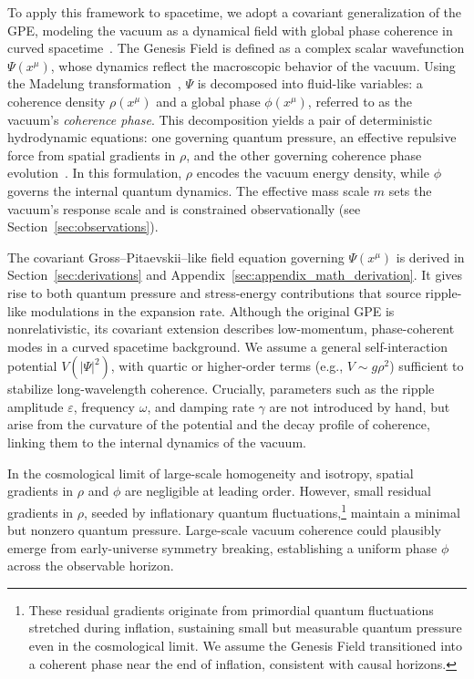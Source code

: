 To apply this framework to spacetime, we adopt a covariant generalization of the GPE, modeling the vacuum as a dynamical field with global phase coherence in curved spacetime~\cite{Barcelo2005,volovik2003universe}. The Genesis Field is defined as a complex scalar wavefunction \( \Psi(x^\mu) \), whose dynamics reflect the macroscopic behavior of the vacuum. Using the Madelung transformation~\cite{Madelung1927}, \( \Psi \) is decomposed into fluid-like variables: a coherence density \( \rho(x^\mu) \) and a global phase \( \phi(x^\mu) \), referred to as the vacuum’s \emph{coherence phase}. This decomposition yields a pair of deterministic hydrodynamic equations: one governing quantum pressure, an effective repulsive force from spatial gradients in \( \rho \), and the other governing coherence phase evolution~\cite{volovik2003universe,Barcelo2005}. In this formulation, \( \rho \) encodes the vacuum energy density, while \( \phi \) governs the internal quantum dynamics. The effective mass scale \( m \) sets the vacuum’s response scale and is constrained observationally (see Section~\ref{sec:observations}).

The covariant Gross–Pitaevskii–like field equation governing \( \Psi(x^\mu) \) is derived in Section~\ref{sec:derivations} and Appendix~\ref{sec:appendix_math_derivation}. It gives rise to both quantum pressure and stress-energy contributions that source ripple-like modulations in the expansion rate. Although the original GPE is nonrelativistic, its covariant extension describes low-momentum, phase-coherent modes in a curved spacetime background. We assume a general self-interaction potential \( V(|\Psi|^2) \), with quartic or higher-order terms (e.g., \( V \sim g \rho^2 \)) sufficient to stabilize long-wavelength coherence. Crucially, parameters such as the ripple amplitude \( \varepsilon \), frequency \( \omega \), and damping rate \( \gamma \) are not introduced by hand, but arise from the curvature of the potential and the decay profile of coherence, linking them to the internal dynamics of the vacuum.

In the cosmological limit of large-scale homogeneity and isotropy, spatial gradients in \( \rho \) and \( \phi \) are negligible at leading order. However, small residual gradients in \( \rho \), seeded by inflationary quantum fluctuations,\footnote{These residual gradients originate from primordial quantum fluctuations stretched during inflation, sustaining small but measurable quantum pressure even in the cosmological limit. We assume the Genesis Field transitioned into a coherent phase near the end of inflation, consistent with causal horizons.} maintain a minimal but nonzero quantum pressure. Large-scale vacuum coherence could plausibly emerge from early-universe symmetry breaking, establishing a uniform phase \( \phi \) across the observable horizon.


